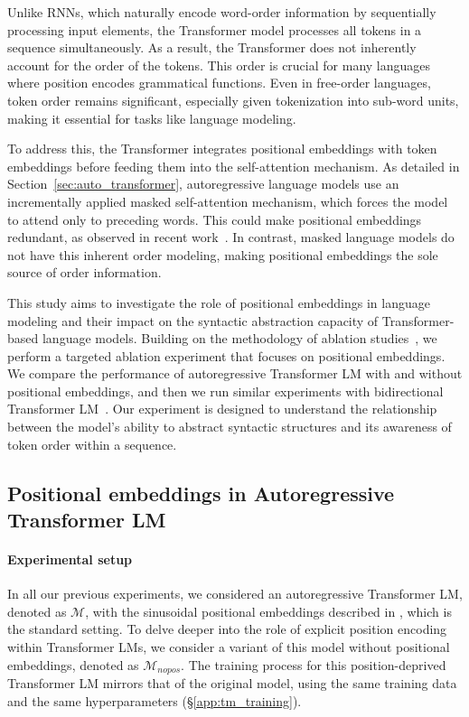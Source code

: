 Unlike RNNs, which naturally encode word-order information by sequentially processing input elements, the Transformer model processes all tokens in a sequence simultaneously. As a result, the Transformer does not inherently account for the order of the tokens. This order is crucial for many languages where position encodes grammatical functions. Even in free-order languages, token order remains significant, especially given tokenization into sub-word units, making it essential for tasks like language modeling. 

To address this, the Transformer integrates positional embeddings with token embeddings before feeding them into the self-attention mechanism. As detailed in Section~\ref{sec:auto_transformer}, autoregressive language models use an incrementally applied masked self-attention mechanism, which forces the model to attend only to preceding words. This could make positional embeddings redundant, as observed in recent work~\cite{haviv-etal-2022-transformer}. In contrast, masked language models do not have this inherent order modeling, making positional embeddings the sole source of order information.

This study aims to investigate the role of positional embeddings in language modeling and their impact on the syntactic abstraction capacity of Transformer-based language models. Building on the methodology of ablation studies~\citep{meyes2019ablation}, we perform a targeted ablation experiment that focuses on positional embeddings. We compare the performance of autoregressive Transformer LM with and without positional embeddings, and then we run similar experiments with bidirectional Transformer LM~\citep{devlin-etal-2019-bert}. Our experiment is designed to understand the relationship between the model's ability to abstract syntactic structures and its awareness of token order within a sequence.

\subsection{Positional embeddings in Autoregressive Transformer LM} \label{sec:exp_1_tm_nopos}

\paragraph{Experimental setup} In all our previous experiments, we considered an autoregressive Transformer LM, denoted as $\mathcal{M}$, with the sinusoidal positional embeddings described in \cite{NIPS2017_3f5ee243}, which is the standard setting. To delve deeper into the role of explicit position encoding within Transformer LMs, we consider a variant of this model without positional embeddings, denoted as $\mathcal{M}_{nopos}$. The training process for this position-deprived Transformer LM mirrors that of the original model, using the same training data and the same hyperparameters (\S\ref{app:tm_training}).

